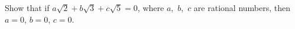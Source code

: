 Show that if $a\sqrt{2} + b\sqrt{3} + c\sqrt{5} = 0$, where $a$,~$b$,~$c$ are rational numbers,
then $a = 0$, $b = 0$, $c = 0$.

